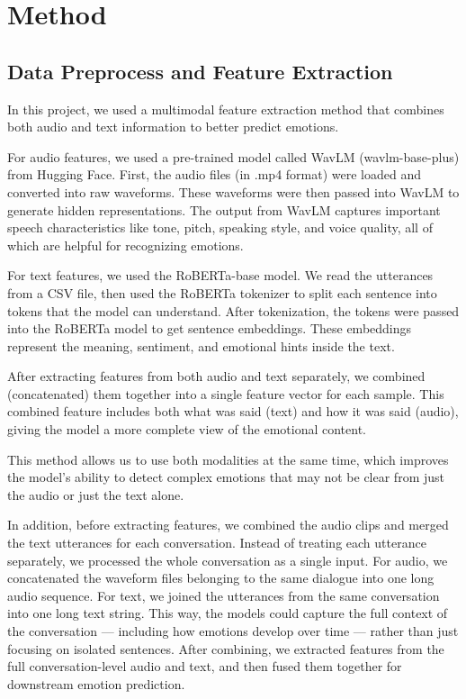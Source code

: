 \documentclass{article}
\begin{document}
\section{Method}
\subsection{Data Preprocess and Feature Extraction}

In this project, we used a multimodal feature extraction method that combines both audio and text information to better predict emotions.

For audio features, we used a pre-trained model called WavLM (wavlm-base-plus) from Hugging Face. First, the audio files (in .mp4 format) were loaded and converted into raw waveforms. These waveforms were then passed into WavLM to generate hidden representations. The output from WavLM captures important speech characteristics like tone, pitch, speaking style, and voice quality, all of which are helpful for recognizing emotions.

For text features, we used the RoBERTa-base model. We read the utterances from a CSV file, then used the RoBERTa tokenizer to split each sentence into tokens that the model can understand. After tokenization, the tokens were passed into the RoBERTa model to get sentence embeddings. These embeddings represent the meaning, sentiment, and emotional hints inside the text.

After extracting features from both audio and text separately, we combined (concatenated) them together into a single feature vector for each sample. This combined feature includes both what was said (text) and how it was said (audio), giving the model a more complete view of the emotional content.

This method allows us to use both modalities at the same time, which improves the model's ability to detect complex emotions that may not be clear from just the audio or just the text alone.

In addition, before extracting features, we combined the audio clips and merged the text utterances for each conversation. Instead of treating each utterance separately, we processed the whole conversation as a single input. For audio, we concatenated the waveform files belonging to the same dialogue into one long audio sequence. For text, we joined the utterances from the same conversation into one long text string. This way, the models could capture the full context of the conversation — including how emotions develop over time — rather than just focusing on isolated sentences. After combining, we extracted features from the full conversation-level audio and text, and then fused them together for downstream emotion prediction.
\end{document}
